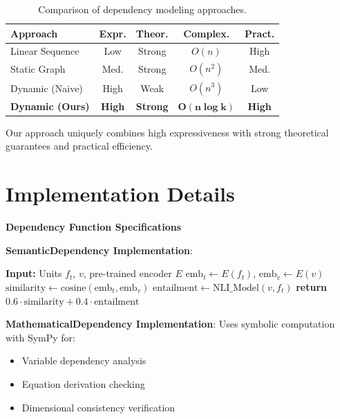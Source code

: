 \documentclass{uai2026} %
\theoremstyle{remark}
\theoremstyle{plain}
\theoremstyle{definition}
\begin{document}
\begin{table}[htb]
\centering
\caption{Comparison of dependency modeling approaches.}
\label{tab:approach-comparison}
\setlength{\tabcolsep}{3pt}
\begin{tabular}{@{}lcccc@{}}
\toprule
Approach & Expr. & Theor. & Complex. & Pract. \\
\midrule
Linear Sequence & Low & Strong & $O(n)$ & High \\
Static Graph & Med. & Strong & $O(n^2)$ & Med. \\
Dynamic (Naive) & High & Weak & $O(n^3)$ & Low \\
\textbf{Dynamic (Ours)} & \textbf{High} & \textbf{Strong} & $\mathbf{O(n \log k)}$ & \textbf{High} \\
\bottomrule
\end{tabular}
\end{table}

Our approach uniquely combines high expressiveness with strong theoretical guarantees and practical efficiency.

\section{Implementation Details}
\label{app:implementation-details}

\textbf{Dependency Function Specifications}

\textbf{SemanticDependency Implementation}:
\begin{algorithm}[H]
\caption{Semantic Dependency Computation}
\begin{algorithmic}[1]
\STATE \textbf{Input:} Units $f_t$, $v$, pre-trained encoder $E$
\STATE $\text{emb}_t \leftarrow E(f_t)$, $\text{emb}_v \leftarrow E(v)$
\STATE $\text{similarity} \leftarrow \text{cosine}(\text{emb}_t, \text{emb}_v)$
\STATE $\text{entailment} \leftarrow \text{NLI\_Model}(v, f_t)$
\STATE \textbf{return} $0.6 \cdot \text{similarity} + 0.4 \cdot \text{entailment}$
\end{algorithmic}
\end{algorithm}

\textbf{MathematicalDependency Implementation}:
Uses symbolic computation with SymPy for:
\begin{itemize}
\item Variable dependency analysis
\item Equation derivation checking  
\item Dimensional consistency verification
\end{itemize}
\end{document}
